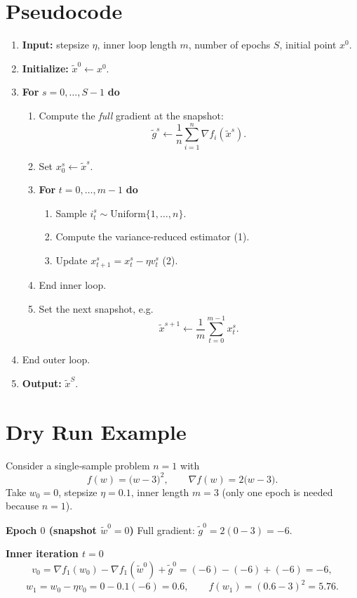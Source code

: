 \documentclass{article}
\newcommand{\grad}{\nabla}
\begin{document}
\section*{Pseudocode}
\begin{enumerate}[label=\textbf{Step \arabic*:}, leftmargin=*, itemsep=0.3ex]
\item \textbf{Input:} stepsize $\eta$, inner loop length $m$, number of epochs $S$,
initial point $x^{0}$.
\item \textbf{Initialize:} $\tilde{x}^{0}\gets x^{0}$.
\item \textbf{For} $s=0,\dots,S-1$ \textbf{do}
\begin{enumerate}[label=\arabic*.]
\item Compute the \emph{full} gradient at the snapshot:
\[
\tilde{g}^{s}\gets \frac{1}{n}\sum_{i=1}^{n}\grad f_i(\tilde{x}^{s}).
\]
\item Set $x_{0}^{s}\gets\tilde{x}^{s}$.
\item \textbf{For} $t=0,\dots,m-1$ \textbf{do}
\begin{enumerate}[label=\alph*.]
\item Sample $i_{t}^{s}\sim\text{Uniform}\{1,\dots,n\}$.
\item Compute the variance‑reduced estimator (1).
\item Update $x_{t+1}^{s}=x_{t}^{s}-\eta v_{t}^{s}$ (2).
\end{enumerate}
\item End inner loop.
\item Set the next snapshot, e.g.
\[
\tilde{x}^{s+1}\gets\frac{1}{m}\sum_{t=0}^{m-1}x_{t}^{s}.
\]
\end{enumerate}
\item End outer loop.
\item \textbf{Output:} $\tilde{x}^{S}$.
\end{enumerate}

\section*{Dry Run Example}
Consider a single‑sample problem $n=1$ with
\[
f(w)=\bigl(w-3\bigr)^{2},\qquad \grad f(w)=2\bigl(w-3\bigr).
\]
Take $w_{0}=0$, stepsize $\eta=0.1$, inner length $m=3$ (only one epoch is needed because
$n=1$).  

\medskip
\noindent\textbf{Epoch $0$ (snapshot $\tilde w^{0}=0$)}  
Full gradient: $\tilde g^{0}=2(0-3)=-6$.

\medskip
\noindent\textbf{Inner iteration $t=0$}
\[
v_{0}= \grad f_{1}(w_{0})-\grad f_{1}(\tilde w^{0})+\tilde g^{0}=(-6)-(-6)+(-6)=-6,
\]
\[
w_{1}=w_{0}-\eta v_{0}=0-0.1(-6)=0.6,
\qquad f(w_{1})=(0.6-3)^{2}=5.76.
\]
\end{document}
